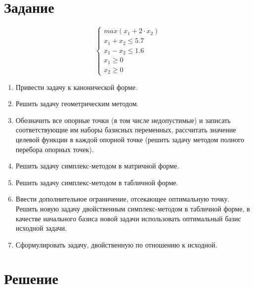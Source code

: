 





\section{Задание}

\begin{displaymath}
\begin{cases}
	max \left( x_1 + 2 \cdot x_2 \right)
	\\
	x_1 + x_2 \leq 5.7
	\\
	x_1 - x_2 \leq 1.6
	\\
	x_1 \geq 0
	\\
	x_2 \geq 0
\end{cases}
\end{displaymath}

\begin{enumerate}

	\item Привести задачу к канонической форме.
	
	\item Решить задачу геометрическим методом.
	
	\item Обозначить все опорные точки (в том числе недопустимые) и записать соответствующие им наборы базисных переменных, рассчитать значение целевой функции в каждой опорной точке (решить задачу методом полного перебора опорных точек).
	
	\item Решить задачу симплекс-методом в матричной форме.	
	
	\item Решить задачу симплекс-методом в табличной форме.

	\item Ввести дополнительное ограничение, отсекающее оптимальную точку. Решить новую задачу двойственным симплекс-методом в табличной форме, в качестве начального базиса новой задачи использовать оптимальный базис исходной задачи.
	
	\item Сформулировать задачу, двойственную по отношению к исходной.

\end{enumerate}

\section{Решение}

